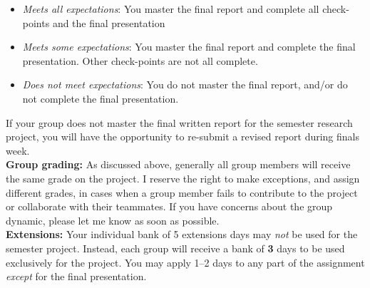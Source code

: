\documentclass[11pt]{article}
\begin{document}
\begin{itemize}
\item \textit{Meets all expectations}: You master the final report and complete all check-points and the final presentation
\item \textit{Meets some expectations}: You master the final report and complete the final presentation. Other check-points are not all complete.
\item \textit{Does not meet expectations}: You do not master the final report, and/or do not complete the final presentation.
\end{itemize}

\noindent If your group does not master the final written report for the semester research project, you will have the opportunity to re-submit a revised report during finals week.\\

\noindent \textbf{Group grading:} As discussed above, generally all group members will receive the same grade on the project. I reserve the right to make exceptions, and assign different grades, in cases when a group member fails to contribute to the project or collaborate with their teammates. If you have concerns about the group dynamic, please let me know as soon as possible.\\

\noindent \textbf{Extensions:} Your individual bank of 5 extensions days may \textit{not} be used for the semester project. Instead, each group will receive a bank of \textbf{3} days to be used exclusively for the project. You may apply 1--2 days to any part of the assignment \textit{except} for the final presentation.
\end{document}
